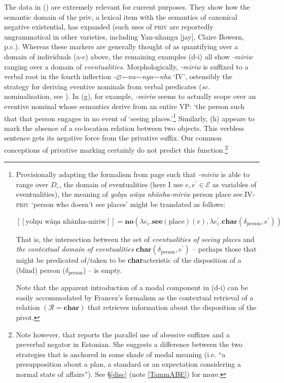 \documentclass[usenames,dvipsnames,11pt]{article}
\newcommand{\denote}[1]{\mbox{$[\![\mbox{#1}]\!]$}}
\begin{document}
{\xe


The data in (\lastx) are extremely relevant for current purposes. They show how the semantic domain of the \gls{priv}, a lexical item with the semantics of canonical negative existential, has expanded (such uses of \textsc{priv} are reportedly ungrammatical in other varieties, including Yan-nhangu [\gls{jay}], Claire Bowern, p.c.). Whereas these markers are generally thought of as quantifying over a domain of individuals (a-c) above, the remaining examples (d-i) all show \textit{-miriw} ranging over a domain of \textit{eventualities}. Morphologically, \mbox{\textit{-miriw}} is suffixed to a verbal root in the fourth inflection \textit{-$\varnothing$\textasciitilde-na\textasciitilde-nya\textasciitilde-nha} `IV', ostensibly the strategy for deriving eventive nominals from verbal predicates (\textit{sc.} nominalisation, see \citealt[103]{Lowe1996}). In (g), for example, \textit{-miriw} seems to actually scope over an eventive nominal whose semantics derive from an entire VP: `the person such that that person engages in no event of `seeing places.'\footnote{Provisionally adapting the formalism from page \pageref{priv-sems} such that \textit{-miriw} is able to range over $D_\varepsilon$, the domain of eventualities (here I use $e,e^\prime\in\mathcal E$ as variables of eventualities), the meaning of \textit{yolŋu wäŋa nhänha-miriw} person place see.IV\textsc{-priv} `person who doesn't see places' might be translated as follows:
	
	$$\denote{yolŋu wäŋa nhänha-miriw} =\textbf{no}(\lambda e_\varepsilon.\textbf{see}(\text{place})(e),\lambda e^\prime_\varepsilon.\textbf{char}(\delta_{\text{person}},e^\prime))$$
	
	That is, the intersection between the set of \textit{eventualities of seeing places} and \textit{the contextual domain of eventualities} $\textbf{char}(\delta_{\text{person}},e^\prime)$ -- perhaps those that might be predicated of/taken to be \textbf{char}acteristic of the disposition of a (blind) person ($\delta_\text{person}$) -- is empty.
	
	Note that the apparent introduction of a modal component in (\lastx d-i) can be easily accommodated by Francez's \citeyearpar{Francez2007} formalism as the contextual retrieval of a relation $(\mathcal R=\textbf{char})$ that retrieves information about the disposition of the pivot.
	} Similarly, (h) appears to mark the absence of a co-location relation between two objects. This verbless sentence gets its negative force from the privative suffix. Our common conceptions of privative marking certainly do not predict this function.\footnote{Note however, that \citet{Tamm2009,Tamm2015} reports the parallel use of abessive suffixes and a preverbal negator in Estonian. She suggests a difference between the two strategies that is anchored in some shade of modal meaning (i.e. ``a presupposition about a plan, a standard or an expectation considering a normal state of affairs''). See §\ref{disc} (note \ref{TammABE}) for more.}

}
\end{document}
